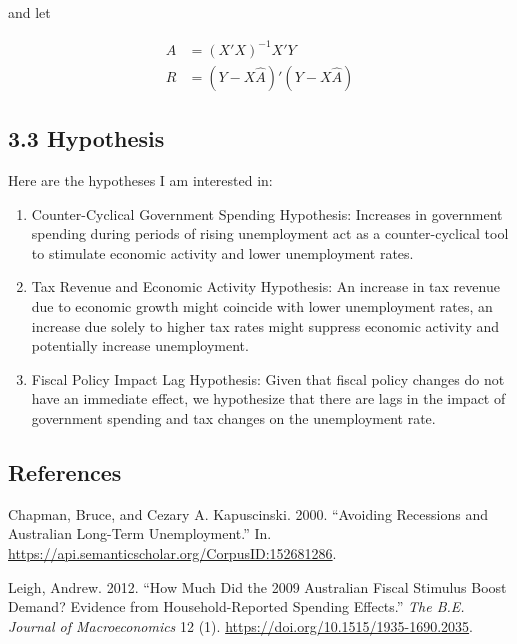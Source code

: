 \documentclass[
  letterpaper,
  DIV=11,
  numbers=noendperiod]{scrartcl}
\newlength{\cslhangindent}
\newlength{\cslentryspacingunit} %
\newenvironment{CSLReferences}[2] %
 {%
  \setlength{\parindent}{0pt}
  \ifodd #1
  \let\oldpar\par
  \def\par{\hangindent=\cslhangindent\oldpar}
  \fi
  \setlength{\parskip}{#2\cslentryspacingunit}
 }%
 {}
\begin{document}
and let

\[
\begin{align*}
\hat{A} &= (X'X)^{-1}X'Y \\
R &= (Y - X\hat{A})'(Y - X\hat{A})
\end{align*}
\]

\hypertarget{hypothesis}{%
\subsection{3.3 Hypothesis}\label{hypothesis}}

Here are the hypotheses I am interested in:

\begin{enumerate}
\def\labelenumi{\arabic{enumi}.}
\item
  Counter-Cyclical Government Spending Hypothesis: Increases in
  government spending during periods of rising unemployment act as a
  counter-cyclical tool to stimulate economic activity and lower
  unemployment rates.
\item
  Tax Revenue and Economic Activity Hypothesis: An increase in tax
  revenue due to economic growth might coincide with lower unemployment
  rates, an increase due solely to higher tax rates might suppress
  economic activity and potentially increase unemployment.
\item
  Fiscal Policy Impact Lag Hypothesis: Given that fiscal policy changes
  do not have an immediate effect, we hypothesize that there are lags in
  the impact of government spending and tax changes on the unemployment
  rate.
\end{enumerate}

\hypertarget{references}{%
\subsection*{References}\label{references}}

\hypertarget{refs}{}
\begin{CSLReferences}{1}{0}
\leavevmode{}%
Chapman, Bruce, and Cezary A. Kapuscinski. 2000. {``Avoiding Recessions
and Australian Long-Term Unemployment.''} In.
\url{https://api.semanticscholar.org/CorpusID:152681286}.

\leavevmode{}%
Leigh, Andrew. 2012. {``How Much Did the 2009 Australian Fiscal Stimulus
Boost Demand? Evidence from Household-Reported Spending Effects.''}
\emph{The B.E. Journal of Macroeconomics} 12 (1).
\url{https://doi.org/10.1515/1935-1690.2035}.

\end{CSLReferences}
\end{document}
